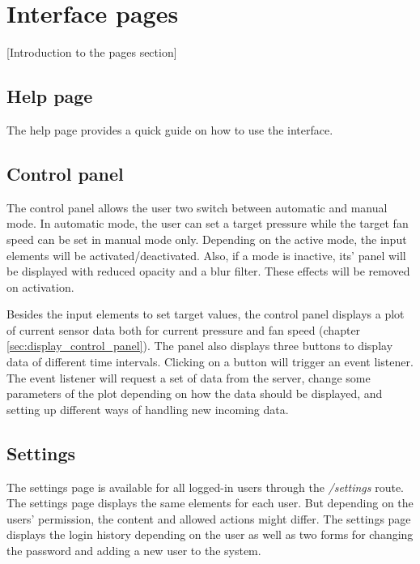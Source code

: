 \chapter{Interface pages}
\label{ch:interface_pages}
[Introduction to the pages section]


\section{Help page}
\label{sec:help}
The help page provides a quick guide on how to use the interface.



\section{Control panel}
\label{sec:control_panel}
The control panel allows the user two switch between automatic and manual mode. In automatic mode, the user can set a target pressure while the target fan speed can be set in manual mode only. Depending on the active mode, the input elements will be activated/deactivated.  Also, if a mode is inactive, its' panel will be displayed with reduced opacity and a blur filter. These effects will be removed on activation.

Besides the input elements to set target values, the control panel displays a plot of current sensor data both for current pressure and fan speed (chapter \ref{sec:display_control_panel}). The panel also displays three buttons to display data of different time intervals. Clicking on a button will trigger an event listener. The event listener will request a set of data from the server, change some parameters of the plot depending on how the data should be displayed, and setting up different ways of handling new incoming data.



\section{Settings}
\label{sec:settings}
The settings page is available for all logged-in users through the \textit{/settings} route. The settings page displays the same elements for each user. But depending on the users' permission, the content and allowed actions might differ. The settings page displays the login history depending on the user as well as two forms for changing the password and adding a new user to the system.


